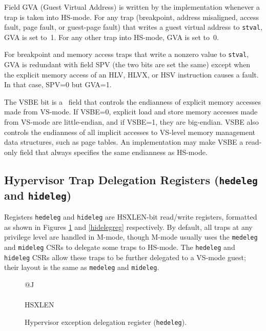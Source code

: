 Field GVA (Guest Virtual Address) is written by the implementation
whenever a trap is taken into HS-mode.
For any trap (breakpoint, address misaligned,
access fault, page fault, or guest-page fault) that writes
a guest virtual address to {\tt stval}, GVA is set to~1.
For any other trap into HS-mode, GVA is set to~0.

\begin{commentary}
For breakpoint and memory access traps
that write a nonzero value to {\tt stval},
GVA is redundant with field SPV (the two bits are set
the same) except when the explicit memory access of an HLV, HLVX, or HSV
instruction causes a fault.
In that case, SPV=0 but GVA=1.
\end{commentary}

The VSBE bit is a \warl\ field that controls the endianness of explicit
memory accesses made from VS-mode.
If VSBE=0, explicit load and store memory accesses made from VS-mode are
little-endian, and if VSBE=1, they are big-endian.
VSBE also controls the endianness of all implicit accesses to VS-level
memory management data structures, such as page tables.
An implementation may make VSBE a read-only field that always specifies
the same endianness as HS-mode.

\subsection{Hypervisor Trap Delegation Registers ({\tt hedeleg} and {\tt hideleg})}

Registers {\tt hedeleg} and {\tt hideleg} are HSXLEN-bit read/write
registers, formatted as shown in Figures \ref{hedelegreg} and
\ref{hidelegreg} respectively.
By default, all traps at any privilege level are handled in M-mode, though
M-mode usually uses the {\tt medeleg} and {\tt mideleg} CSRs to delegate
some traps to HS-mode.  The {\tt hedeleg} and {\tt hideleg} CSRs allow these
traps to be further delegated to a VS-mode guest; their layout is the same
as {\tt medeleg} and {\tt mideleg}.

\begin{figure}[h!]
{\footnotesize
\begin{center}
\begin{tabular}{@{}J}
 \\
\hline
{} \\
\hline
HSXLEN \\
\end{tabular}
\end{center}
}
\vspace{-0.1in}
\caption{Hypervisor exception delegation register ({\tt hedeleg}).}
\label{hedelegreg}
\end{figure}

